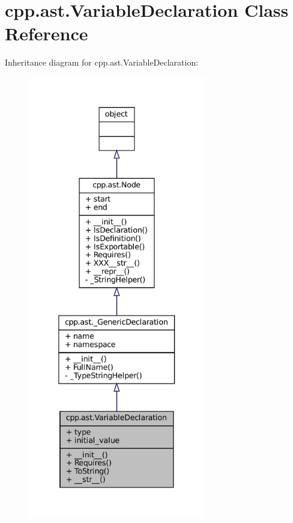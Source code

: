 \hypertarget{classcpp_1_1ast_1_1VariableDeclaration}{}\section{cpp.\+ast.\+Variable\+Declaration Class Reference}
\label{classcpp_1_1ast_1_1VariableDeclaration}


Inheritance diagram for cpp.\+ast.\+Variable\+Declaration\+:
\nopagebreak
\begin{figure}[H]
\begin{center}
\leavevmode
\includegraphics[height=550pt]{classcpp_1_1ast_1_1VariableDeclaration__inherit__graph}
\end{center}
\end{figure}



